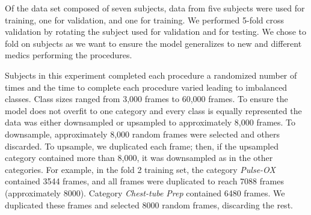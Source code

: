 \documentclass[letterpaper, 10 pt, conference]{ieeeconf}  %
\begin{document}


Of the data set composed of seven subjects, data from 
five subjects were used for training, one for validation, and one for training. We performed 5-fold cross validation by rotating the subject used for validation and for testing. We chose to fold on subjects as we want to ensure the model generalizes to new and different medics performing the procedures.


Subjects in this experiment completed each procedure a randomized number of times and the time to complete each procedure varied leading to imbalanced classes. Class sizes ranged from 3,000 frames to 60,000 frames. To ensure the model does not overfit to one category and every class is equally represented the data was either downsampled or upsampled to approximately 8,000 frames. To downsample, approximately 8,000 random frames were selected and others discarded. To upsample, we duplicated each frame; then, if the upsampled category contained more than 8,000, it was downsampled as in the other categories. For example, in the fold 2 training set, the category \textit{Pulse-OX} contained 3544 frames, and all frames were duplicated to reach 7088 frames (approximately 8000). Category \textit{Chest-tube Prep} contained 6480 frames. We duplicated these frames and selected 8000 random frames, discarding the rest. 
\end{document}
